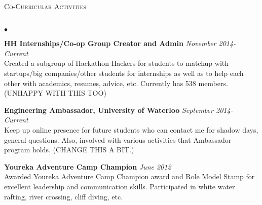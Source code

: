 \documentclass{article}
\newcommand{\lineunder}{\vspace*{-8pt} \\ \hspace*{-18pt} \hrulefill \\}
\newcommand{\header}[1]{{\hspace*{-15pt}\vspace*{6pt} \textsc{#1}} \vspace*{-6pt} \lineunder}
\newenvironment{achievements}{\begin{list}{$\bullet$}{\topsep 0pt \itemsep -2pt}}{\vspace*{4pt}\end{list}}
\begin{document}
{\vspace{7pt}

\header{Co-Curricular Activities}
\begin{achievements}
\item \textbf{HH Internships/Co-op Group Creator and Admin} \hfill \textit {November 2014- Current}
\\ Created a subgroup of Hackathon Hackers for students to matchup with startups/big companies/other students for internships as well as to help each other with academics, resumes, advice, etc. Currently has 538 members.(UNHAPPY WITH THIS TOO)
\item \textbf{Engineering Ambassador, University of Waterloo} \hfill \textit {September 2014- Current}
\\Keep up online presence for future students who can contact me for shadow days, general questions. Also, involved with various activities that Ambassador program holds. (CHANGE THIS A BIT.)
\item \textbf{Youreka Adventure Camp Champion} \hfill \textit {June 2012}
\\ Awarded Youreka Adventure Camp Champion award and Role Model Stamp for excellent leadership and communication skills. Participated in white water rafting, river crossing, cliff diving, etc.
\end{achievements}

\newpage
\end{document}
